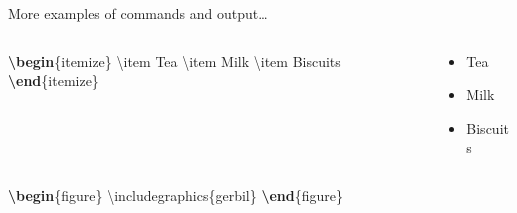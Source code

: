 \documentclass[,aspectratio=43]{beamer}
\newenvironment{Shaded}{\begin{snugshade}}{\end{snugshade}}
\newcommand{\BuiltInTok}[1]{#1}
\newcommand{\ExtensionTok}[1]{#1}
\newcommand{\FunctionTok}[1]{\textcolor[rgb]{0.02,0.16,0.49}{#1}}
\newcommand{\KeywordTok}[1]{\textcolor[rgb]{0.00,0.44,0.13}{\textbf{#1}}}
\newcommand{\NormalTok}[1]{#1}
\begin{document}
\begin{frame}[fragile]{More examples of commands and output\ldots{}}
\protect\hypertarget{more-examples-of-commands-and-output}{}
\vspace{-1.5em}

\begin{columns}[T]
\begin{column}{0.48\textwidth}
\begin{Shaded}
\begin{Highlighting}[]
\KeywordTok{\textbackslash{}begin}\NormalTok{\{}\ExtensionTok{itemize}\NormalTok{\}}
  \FunctionTok{\textbackslash{}item}\NormalTok{ Tea}
  \FunctionTok{\textbackslash{}item}\NormalTok{ Milk}
  \FunctionTok{\textbackslash{}item}\NormalTok{ Biscuits}
\KeywordTok{\textbackslash{}end}\NormalTok{\{}\ExtensionTok{itemize}\NormalTok{\}}
\end{Highlighting}
\end{Shaded}
\end{column}

\begin{column}{0.48\textwidth}
\vspace{2em}

\begin{itemize}
\item Tea
\item Milk
\item Biscuits
\end{itemize}
\end{column}
\end{columns}

\begin{columns}[T]
\begin{column}{0.48\textwidth}
\begin{Shaded}
\begin{Highlighting}[]
\KeywordTok{\textbackslash{}begin}\NormalTok{\{}\ExtensionTok{figure}\NormalTok{\}}
  \BuiltInTok{\textbackslash{}includegraphics}\NormalTok{\{}\ExtensionTok{gerbil}\NormalTok{\}}
\KeywordTok{\textbackslash{}end}\NormalTok{\{}\ExtensionTok{figure}\NormalTok{\}}
\end{Highlighting}
\end{Shaded}
\end{column}


\end{columns}
\end{frame}
\end{document}
